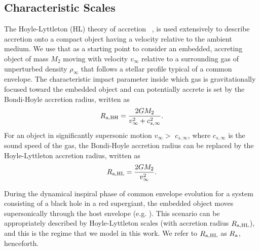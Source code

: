 \subsection{Characteristic Scales}
The Hoyle-Lyttleton (HL) theory of accretion ~\cite{1939PCPS...35..405H,1944MNRAS.104..273B,Edgar:2004}, is used extensively to describe accretion onto a compact object having a velocity relative to the ambient medium. We use that as a starting point to consider an embedded, accreting object of mass $M_2$ moving with velocity $v_{\infty}$ relative to a surrounding gas of unperturbed density $\rho_\infty$ that follows a stellar profile typical of a common envelope. The characteristic impact parameter inside which gas is gravitationally focused toward the embedded object and can potentially accrete is set by the Bondi-Hoyle accretion radius, written as
\begin{equation}
R_{\rm{a, BH}} = \frac{2GM_2}{v_{\infty}^{2} + c_{s, \infty}^{2}}.
\end{equation}
For an object in significantly supersonic motion $v_{\infty} >$ $c_{s, \infty}$, where $c_{s, \infty}$ is the sound speed of the gas, the Bondi-Hoyle accretion radius can be replaced by the Hoyle-Lyttleton accretion radius, written as
\begin{equation}
R_{\rm{a, HL}} = \frac{2GM_2}{v_{\infty}^{2}}.
\end{equation}

During the dynamical inspiral phase of common envelope evolution for a system consisting of a black hole in a red supergiant, the embedded object moves supersonically through the host envelope (e.g. \cite{MacLeod_2015}). This scenario can be appropriately described by Hoyle-Lyttleton scales (with accretion radius $R_{\rm a, HL}$), and this is the regime that we model in this work. We refer to $R_{\rm a, HL}$ as $R_{\rm a}$, henceforth. %

